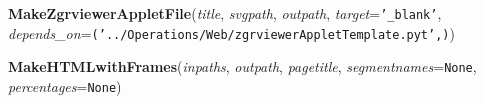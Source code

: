 \hspace{.8\funcindent}\begin{boxedminipage}{\funcwidth}

    \raggedright \textbf{MakeZgrviewerAppletFile}(\textit{title}, \textit{svgpath}, \textit{outpath}, \textit{target}={\tt '\_blank'}, \textit{depends\_on}={\tt ('../Operations/Web/zgrviewerAppletTemplate.pyt',)})

\setlength{\parskip}{2ex}
\setlength{\parskip}{1ex}
    \end{boxedminipage}

    \label{System:Web:HTMLCreators:MakeHTMLwithFrames}

    \vspace{0.5ex}

\hspace{.8\funcindent}\begin{boxedminipage}{\funcwidth}

    \raggedright \textbf{MakeHTMLwithFrames}(\textit{inpaths}, \textit{outpath}, \textit{pagetitle}, \textit{segmentnames}={\tt None}, \textit{percentages}={\tt None})

\setlength{\parskip}{2ex}
\setlength{\parskip}{1ex}
    \end{boxedminipage}

